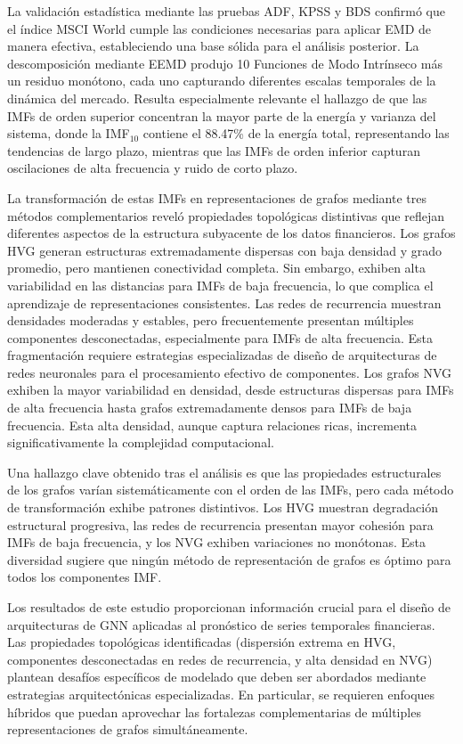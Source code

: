 \documentclass[11pt,a4paper]{article}
\begin{document}
La validación estadística mediante las pruebas ADF, KPSS y BDS confirmó que el índice MSCI World cumple las condiciones necesarias para aplicar EMD de manera efectiva, estableciendo una base sólida para el análisis posterior. La descomposición mediante EEMD produjo 10 Funciones de Modo Intrínseco más un residuo monótono, cada uno capturando diferentes escalas temporales de la dinámica del mercado. Resulta especialmente relevante el hallazgo de que las IMFs de orden superior concentran la mayor parte de la energía y varianza del sistema, donde la IMF$_{10}$ contiene el 88.47\% de la energía total, representando las tendencias de largo plazo, mientras que las IMFs de orden inferior capturan oscilaciones de alta frecuencia y ruido de corto plazo.

La transformación de estas IMFs en representaciones de grafos mediante tres métodos complementarios reveló propiedades topológicas distintivas que reflejan diferentes aspectos de la estructura subyacente de los datos financieros. Los grafos HVG generan estructuras extremadamente dispersas con baja densidad y grado promedio, pero mantienen conectividad completa. Sin embargo, exhiben alta variabilidad en las distancias para IMFs de baja frecuencia, lo que complica el aprendizaje de representaciones consistentes. Las redes de recurrencia muestran densidades moderadas y estables, pero frecuentemente presentan múltiples componentes desconectadas, especialmente para IMFs de alta frecuencia. Esta fragmentación requiere estrategias especializadas de diseño de arquitecturas de redes neuronales para el procesamiento efectivo de componentes. Los grafos NVG exhiben la mayor variabilidad en densidad, desde estructuras dispersas para IMFs de alta frecuencia hasta grafos extremadamente densos para IMFs de baja frecuencia. Esta alta densidad, aunque captura relaciones ricas, incrementa significativamente la complejidad computacional.

Una hallazgo clave obtenido tras el análisis es que las propiedades estructurales de los grafos varían sistemáticamente con el orden de las IMFs, pero cada método de transformación exhibe patrones distintivos. Los HVG muestran degradación estructural progresiva, las redes de recurrencia presentan mayor cohesión para IMFs de baja frecuencia, y los NVG exhiben variaciones no monótonas. Esta diversidad sugiere que ningún método de representación de grafos es óptimo para todos los componentes IMF.

Los resultados de este estudio proporcionan información crucial para el diseño de arquitecturas de GNN aplicadas al pronóstico de series temporales financieras. Las propiedades topológicas identificadas (dispersión extrema en HVG, componentes desconectadas en redes de recurrencia, y alta densidad en NVG) plantean desafíos específicos de modelado que deben ser abordados mediante estrategias arquitectónicas especializadas. En particular, se requieren enfoques híbridos que puedan aprovechar las fortalezas complementarias de múltiples representaciones de grafos simultáneamente.
\end{document}
